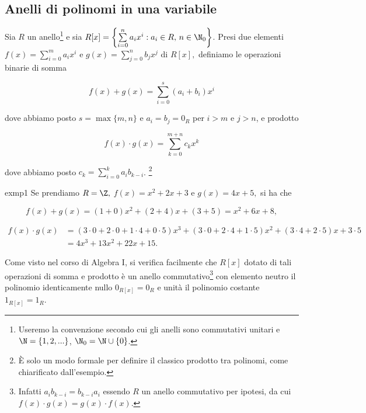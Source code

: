 
\vspace{1.75mm}
\subsection{Anelli di polinomi in una variabile}

Sia $R$ un anello\footnote{Useremo la convenzione secondo cui gli anelli sono commutativi unitari 
e $\N=\{1,2,...\}$, $\N_0=\N\cup \{0\}$.} 
e sia $R[x]=\left\{\sum\limits_{i=0}^n a_i x^i : a_i\in R,\, n\in \N_0\right\}$.
Presi due elementi $f(x)=\sum\limits_{i=0}^m a_i x^i$ e $g(x)=\sum\limits_{j=0}^n b_j x^j$ di $R[x],$ 
definiamo le operazioni binarie di somma {\setlength{\belowdisplayskip}{4.5pt} 
\setlength{\abovedisplayskip}{-3.5pt} 

\[ f(x)+g(x)=\sum\limits_{i=0}^s (a_i+b_i)x^i \] 

\noindent dove abbiamo posto $s=\max\{m,n\}$ e $a_i=b_j=0_R$ per $i>m$ e $j>n$, e prodotto} 
{\setlength{\belowdisplayskip}{-3.5pt} \setlength{\abovedisplayskip}{3pt} 

\[ f(x)\cdot g(x)=\sum\limits_{k=0}^{m+n}c_k x^k\] 

\noindent dove abbiamo posto $c_k=\sum\limits_{i=0}^{k}a_i b_{k-i}$.
\footnote{È solo un modo formale per definire il classico prodotto tra polinomi, come chiarificato dall'esempio.}}


\begin{example}[]{exmp1}
Se prendiamo $R=\Z,$ $f(x)=x^2+2x+3$ e $g(x)=4x+5,$ si ha che 

\[ f(x)+g(x)=(1+0)x^2+(2+4)x+(3+5)=x^2+6x+8, \] 

{\setlength{\belowdisplayskip}{-2pt}\setlength{\abovedisplayskip}{0pt}
\begin{align*}
f(x)\cdot g(x) 
  &= (3\cdot 0+2\cdot 0+1\cdot 4+0\cdot 5)x^3+(3\cdot 0+2\cdot 4+1\cdot 5)x^2+(3\cdot 4+2\cdot 5)x+3\cdot 5 \\ 
  &= 4x^3+13x^2+22x+15. \ 
\end{align*}}
\end{example}

\noindent Come visto nel corso di Algebra I, si verifica facilmente che $R[x]$ dotato di tali operazioni di somma e prodotto 
è un anello commutativo\footnote{Infatti $a_ib_{k-i}=b_{k-i}a_i$ essendo $R$ un anello commutativo per ipotesi, 
da cui $f(x)\cdot g(x)=g(x)\cdot f(x)$.} con elemento neutro il polinomio identicamente nullo $0_{R[x]}=0_{R}$ 
e unità il polinomio costante $1_{R[x]}=1_{R}$. 

\vspace{1.5mm}

